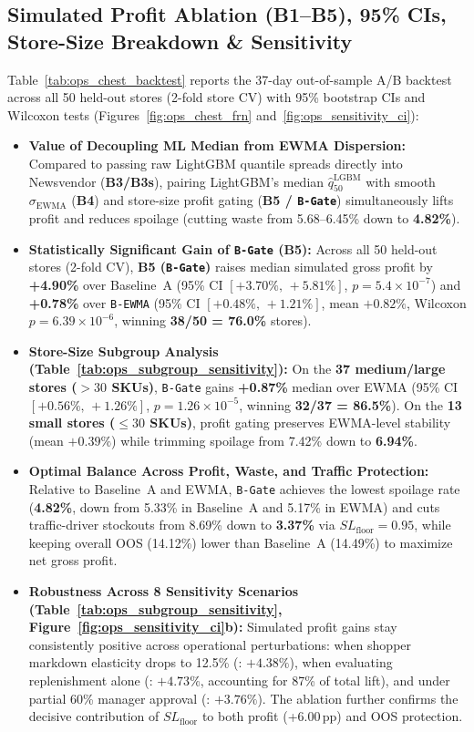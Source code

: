 \subsection*{Simulated Profit Ablation (B1--B5), 95\% CIs, Store-Size Breakdown \& Sensitivity}
Table~\ref{tab:ops_chest_backtest} reports the 37-day out-of-sample A/B backtest across all 50 held-out stores (2-fold store CV) with 95\% bootstrap CIs and Wilcoxon tests (Figures~\ref{fig:ops_chest_frn} and~\ref{fig:ops_sensitivity_ci}):
\begin{itemize}
    \item \textbf{Value of Decoupling ML Median from EWMA Dispersion:} Compared to passing raw LightGBM quantile spreads directly into Newsvendor (\textbf{B3/B3s}), pairing LightGBM's median $\hat{q}_{50}^{\text{LGBM}}$ with smooth $\sigma_{\text{EWMA}}$ (\textbf{B4}) and store-size profit gating (\textbf{B5 / \texttt{B-Gate}}) simultaneously lifts profit and reduces spoilage (cutting waste from 5.68--6.45\% down to \textbf{4.82\%}).
    \item \textbf{Statistically Significant Gain of \texttt{B-Gate} (B5):} Across all 50 held-out stores (2-fold CV), \textbf{B5 (\texttt{B-Gate})} raises median simulated gross profit by \textbf{+4.90\%} over Baseline~A (95\% CI $[+3.70\%,\,+5.81\%]$, $p=5.4\times 10^{-7}$) and \textbf{+0.78\%} over \texttt{B-EWMA} (95\% CI \textbf{$[+0.48\%,\,+1.21\%]$}, mean $+0.82\%$, Wilcoxon \textbf{$p = 6.39\times 10^{-6}$}, winning \textbf{38/50 = 76.0\%} stores).
    \item \textbf{Store-Size Subgroup Analysis (Table~\ref{tab:ops_subgroup_sensitivity}):} On the \textbf{37 medium/large stores ($>30$ SKUs)}, \texttt{B-Gate} gains \textbf{+0.87\%} median over EWMA (95\% CI $[+0.56\%,\,+1.26\%]$, $p = 1.26\times 10^{-5}$, winning \textbf{32/37 = 86.5\%}). On the \textbf{13 small stores ($\le 30$ SKUs)}, profit gating preserves EWMA-level stability (mean $+0.39\%$) while trimming spoilage from 7.42\% down to \textbf{6.94\%}.
    \item \textbf{Optimal Balance Across Profit, Waste, and Traffic Protection:} Relative to Baseline~A and EWMA, \texttt{B-Gate} achieves the lowest spoilage rate (\textbf{4.82\%}, down from 5.33\% in Baseline~A and 5.17\% in EWMA) and cuts traffic-driver stockouts from 8.69\% down to \textbf{3.37\%} via $SL_{\text{floor}} = 0.95$, while keeping overall OOS (14.12\%) lower than Baseline~A (14.49\%) to maximize net gross profit.
    \item \textbf{Robustness Across 8 Sensitivity Scenarios (Table~\ref{tab:ops_subgroup_sensitivity}, Figure~\ref{fig:ops_sensitivity_ci}b):} Simulated profit gains stay consistently positive across operational perturbations: when shopper markdown elasticity drops to 12.5\% (: $+4.38\%$), when evaluating replenishment alone (: $+4.73\%$, accounting for 87\% of total lift), and under partial 60\% manager approval (: $+3.76\%$). The  ablation further confirms the decisive contribution of $SL_{\text{floor}}$ to both profit (+6.00\,pp) and OOS protection.
\end{itemize}


